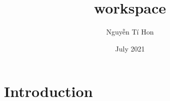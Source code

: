 \documentclass{article}
\title{workspace}
\author{Nguyễn Tí Hon}
\date{July 2021}
\begin{document}
\maketitle

\section{Introduction}

\end{document}
